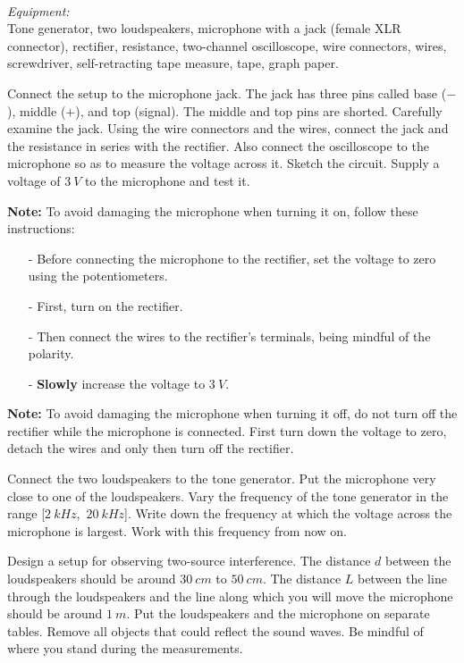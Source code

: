 \documentclass[../TST.tex]{subfiles}
\begin{document}
\begin{eproblem}{\ \\[5pt]}
\textit{Equipment:}\\
Tone generator, two loudspeakers, microphone with a jack (female XLR connector), rectifier, resistance, two-channel oscilloscope, wire connectors, wires, screwdriver, self-retracting tape measure, tape, graph paper.
\begin{subpart}
	\item Connect the setup to the microphone jack. The jack has three pins called base ($-$), middle ($+$), and top (signal). The middle and top pins are shorted. Carefully examine the jack. Using the wire connectors and the wires, connect the jack and the resistance in series with the rectifier. Also connect the oscilloscope to the microphone so as to measure the voltage across it. Sketch the circuit. Supply a voltage of $\qty{3}{V}$ to the microphone and test it. 
\end{subpart}
\textbf{Note:} To avoid damaging the microphone when turning it on, follow these instructions:
\begin{itemize}[nosep]
	\item[-] Before connecting the microphone to the rectifier, set the voltage to zero using the potentiometers.
	\item[-] First, turn on the rectifier.
	\item[-] Then connect the wires to the rectifier's terminals, being mindful of the polarity.
	\item[-] \textbf{Slowly} increase the voltage to $\qty{3}{V}$.\\[-5pt]
\end{itemize}
\textbf{Note:} To avoid damaging the microphone when turning it off, do not turn off the rectifier while the microphone is connected. First turn down the voltage to zero, detach the wires and only then turn off the rectifier.
\begin{subpart}[resume]
	\item Connect the two loudspeakers to the tone generator. Put the microphone very close to one of the loudspeakers. Vary the frequency of the tone generator in the range \hbox{[$\qty{2}{kHz}$, $\qty{20}{kHz}$]}. Write down the frequency at which the voltage across the microphone is largest. Work with this frequency from now on. 
\end{subpart}
Design a setup for observing two-source interference. The distance $d$ between the loudspeakers should be around $\qty{30}{cm}$ to $\qty{50}{cm}$. The distance $L$ between the line through the loudspeakers and the line along which you will move the microphone should be around $\qty{1}{m}$. Put the loudspeakers and the microphone on separate tables. Remove all objects that could reflect the sound waves. Be mindful of where you stand during the measurements.

\end{eproblem}
\end{document}
